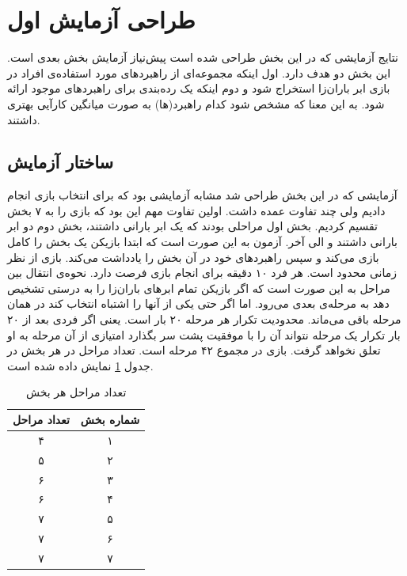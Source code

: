 \documentclass[twoside, a4paper,11pt]{book}
\numberwithin{equation}{chapter}
\numberwithin{table}{chapter}
\numberwithin{figure}{chapter}
\numberwithin{equation}{chapter}
\begin{document}
\section{طراحی آزمایش اول}
نتایج آزمایشی که در این بخش طراحی شده است پیش‌نیاز آزمایش بخش بعدی است. این بخش دو هدف دارد. اول اینکه مجموعه‌ای از راهبرد‌های مورد استفاده‌ی افراد در بازی ابر باران‌زا استخراج شود و دوم اینکه یک رده‌بندی برای راهبرد‌های موجود ارائه شود. به این معنا که مشخص شود کدام راهبرد‌(ها) به صورت میانگین کارآیی بهتری داشتند. 

\subsection{ساختار آزمایش}
آزمایشی که در این بخش طراحی شد مشابه آزمایشی بود که برای انتخاب بازی انجام دادیم ولی چند تفاوت عمده داشت. اولین تفاوت مهم این بود که بازی را به ۷ بخش تقسیم کردیم. بخش اول مراحلی بودند که یک ابر بارانی داشتند، بخش دوم دو ابر بارانی داشتند و الی آخر. آزمون به این صورت است که ابتدا بازیکن یک بخش را کامل بازی می‌کند و سپس راهبرد‌های خود در آن بخش را یادداشت می‌کند. بازی از نظر زمانی محدود است. هر فرد ۱۰ دقیقه برای انجام بازی فرصت دارد. نحوه‌ی انتقال بین مراحل به این صورت است که اگر بازیکن تمام ابرهای باران‌زا را به درستی تشخیص دهد به مرحله‌ی بعدی می‌رود. اما اگر حتی یکی از آنها را اشتباه انتخاب کند در همان مرحله باقی می‌ماند. محدودیت تکرار هر مرحله ۲۰ بار است. یعنی اگر فردی بعد از ۲۰ بار تکرار یک مرحله نتواند آن را با موفقیت پشت سر بگذارد امتیازی از آن مرحله به او تعلق نخواهد گرفت. بازی در مجموع ۴۲ مرحله است. تعداد مراحل در هر بخش در جدول \ref{numOfLevelTable} نمایش داده شده است.

\begin{table}[]
\centering
\caption{تعداد مراحل هر بخش}
\label{numOfLevelTable}
\begin{tabular}{|c|c|}
\hline
\textbf{تعداد مراحل} & \textbf{شماره بخش} \\ \hline
۴                    & ۱                  \\ \hline
۵                    & ۲                  \\ \hline
۶                    & ۳                  \\ \hline
۶                    & ۴                  \\ \hline
۷                    & ۵                  \\ \hline
۷                    & ۶                  \\ \hline
۷                    & ۷                  \\ \hline
\end{tabular}
\end{table}
\end{document}
